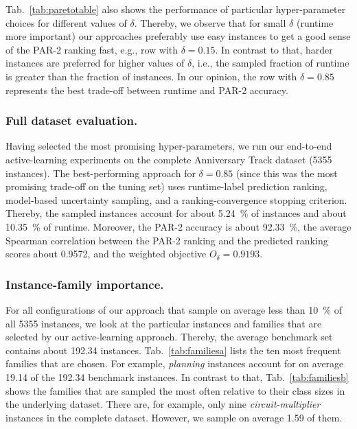 \documentclass[runningheads]{llncs}
\begin{document}
Tab.~\ref{tab:paretotable} also shows the performance of particular hyper-parameter choices for different values of $\delta$.
Thereby, we observe that for small $\delta$ (runtime more important) our approaches preferably use easy instances to get a good sense of the PAR-2 ranking fast, e.g., row with $\delta = 0.15$.
In contrast to that, harder instances are preferred for higher values of $\delta$, i.e., the sampled fraction of runtime is greater than the fraction of instances.
In our opinion, the row with $\delta = 0.85$ represents the best trade-off between runtime and PAR-2 accuracy.

\subsubsection{Full dataset evaluation.}
Having selected the most promising hyper-parameters, we run our end-to-end active-learning experiments on the complete Anniversary Track dataset (5355 instances).
The best-performing approach for $\delta = 0.85$ (since this was the most promising trade-off on the tuning set) uses runtime-label prediction ranking, model-based uncertainty sampling, and a ranking-convergence stopping criterion.
Thereby, the sampled instances account for about \SI{5.24}{\%} of instances and about \SI{10.35}{\%} of runtime.
Moreover, the PAR-2 accuracy is about \SI{92.33}{\%}, the average Spearman correlation between the PAR-2 ranking and the predicted ranking scores about \SI{0.9572}{}, and the weighted objective $O_{\delta} = 0.9193$.

\subsubsection{Instance-family importance.}
For all configurations of our approach that sample on average less than \SI{10}{\%} of all 5355 instances, we look at the particular instances and families that are selected by our active-learning approach.
Thereby, the average benchmark set contains about \SI{192.34}{} instances.
Tab.~\ref{tab:familiesa} lists the ten most frequent families that are chosen. For example, \textit{planning} instances account for on average \SI{19.14}{} of the \SI{192.34}{} benchmark instances.
In contrast to that, Tab.~\ref{tab:familiesb} shows the families that are sampled the most often relative to their class sizes in the underlying dataset.
There are, for example, only nine \textit{circuit-multiplier} instances in the complete dataset.
However, we sample on average \SI{1.59}{} of them.
\end{document}
